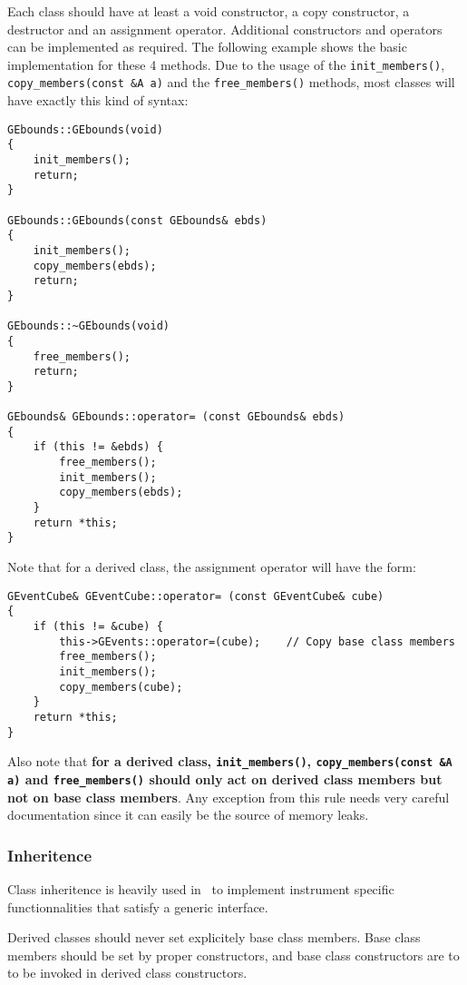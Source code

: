\documentclass{article}[12pt,a4]
\begin{document}
Each class should have at least a void constructor, a copy constructor, a destructor and
an assignment operator.
Additional constructors and operators can be implemented as required.
The following example shows the basic implementation for these 4 methods.
Due to the usage of the {\tt init\_members()}, {\tt copy\_members(const \&A a)} and the
{\tt free\_members()} methods, most classes will have exactly this kind of syntax:
\begin{verbatim}
GEbounds::GEbounds(void)
{
    init_members();
    return;
}

GEbounds::GEbounds(const GEbounds& ebds)
{
    init_members();
    copy_members(ebds);
    return;
}

GEbounds::~GEbounds(void)
{
    free_members();
    return;
}

GEbounds& GEbounds::operator= (const GEbounds& ebds)
{
    if (this != &ebds) {
        free_members();
        init_members();
        copy_members(ebds);
    }
    return *this;
}
\end{verbatim}
Note that for a derived class, the assignment operator will have the form:
\begin{verbatim}
GEventCube& GEventCube::operator= (const GEventCube& cube)
{
    if (this != &cube) {
        this->GEvents::operator=(cube);    // Copy base class members
        free_members();
        init_members();
        copy_members(cube);
    }
    return *this;
}
\end{verbatim}
Also note that {\bf for a derived class, {\tt init\_members()}, {\tt copy\_members(const \&A a)}
and {\tt free\_members()} should only act on derived class members but not on
base class members}.
Any exception from this rule needs very careful documentation since it can easily be
the source of memory leaks.


\subsubsection{Inheritence}

Class inheritence is heavily used in \this\ to implement instrument specific functionnalities
that satisfy a generic interface.

Derived classes should never set explicitely base class members.
Base class members should be set by proper constructors, and base class constructors are
to to be invoked in derived class constructors.
\end{document}
